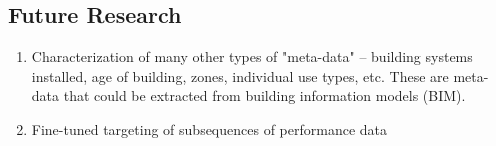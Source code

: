 \subsection{Future Research}
\label{sec:futureresearch}

\begin{enumerate}
\item Characterization of many other types of "meta-data" -- building systems installed, age of building, zones, individual use types, etc. These are meta-data that could be extracted from building information models (BIM). 
\item Fine-tuned targeting of subsequences of performance data
\end{enumerate}
